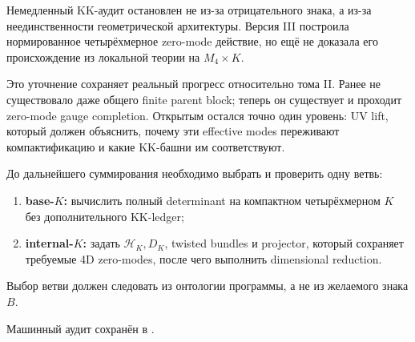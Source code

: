 \begin{theorem}
Немедленный KK-аудит остановлен не из-за отрицательного знака, а из-за
неединственности геометрической архитектуры. Версия III построила
нормированное четырёхмерное zero-mode действие, но ещё не доказала его
происхождение из локальной теории на \(M_4\times K\).
\end{theorem}

Это уточнение сохраняет реальный прогресс относительно тома II. Ранее не
существовало даже общего finite parent block; теперь он существует и
проходит zero-mode gauge completion. Открытым остался точно один уровень:
UV lift, который должен объяснить, почему эти effective modes переживают
компактификацию и какие KK-башни им соответствуют.

\begin{protocol}
До дальнейшего суммирования необходимо выбрать и проверить одну ветвь:
\begin{enumerate}
 \item \textbf{base-\(K\):} вычислить полный determinant на компактном
 четырёхмерном \(K\) без дополнительного KK-ledger;
 \item \textbf{internal-\(K\):} задать
 \(\mathcal H_K,D_K\), twisted bundles и projector, который сохраняет
 требуемые 4D zero-modes, после чего выполнить dimensional reduction.
\end{enumerate}
Выбор ветви должен следовать из онтологии программы, а не из желаемого
знака \(B\).
\end{protocol}

Машинный аудит сохранён в
.